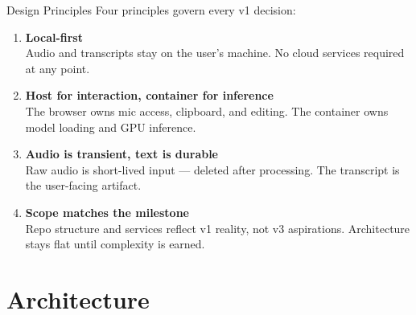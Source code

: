\documentclass{beamer}
\begin{document}
\begin{frame}{Design Principles}
    Four principles govern every v1 decision:

    \vspace{0.6em}
    \begin{enumerate}
        \item \textbf{Local-first}\\
              Audio and transcripts stay on the user's machine.
              No cloud services required at any point.

        \vspace{0.3em}
        \item \textbf{Host for interaction, container for inference}\\
              The browser owns mic access, clipboard, and editing.
              The container owns model loading and GPU inference.

        \vspace{0.3em}
        \item \textbf{Audio is transient, text is durable}\\
              Raw audio is short-lived input --- deleted after processing.
              The transcript is the user-facing artifact.

        \vspace{0.3em}
        \item \textbf{Scope matches the milestone}\\
              Repo structure and services reflect v1 reality,
              not v3 aspirations. Architecture stays flat until
              complexity is earned.
    \end{enumerate}
\end{frame}


\section{Architecture}
\end{document}
